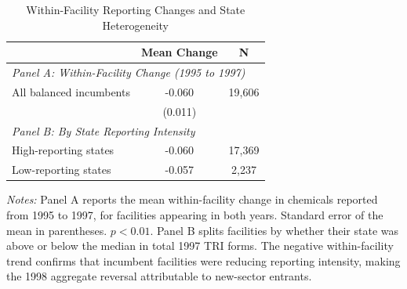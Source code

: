 \begin{table}[H]
\centering
\caption{Within-Facility Reporting Changes and State Heterogeneity}
\label{tab:robust}
\begin{threeparttable}
\begin{tabular}{lcc}
\toprule
 & Mean Change & N \\
\midrule
\multicolumn{3}{l}{\textit{Panel A: Within-Facility Change (1995 to 1997)}} \\
All balanced incumbents & -0.060\sym{***} & 19,606 \\
 & (0.011) & \\
\midrule
\multicolumn{3}{l}{\textit{Panel B: By State Reporting Intensity}} \\
High-reporting states & -0.060 & 17,369 \\
Low-reporting states & -0.057 & 2,237 \\
\bottomrule
\end{tabular}
\begin{tablenotes}[flushleft]
\small
\item \textit{Notes:} Panel A reports the mean within-facility change in chemicals reported from 1995 to 1997, for facilities appearing in both years. Standard error of the mean in parentheses. \sym{***} $p<0.01$. Panel B splits facilities by whether their state was above or below the median in total 1997 TRI forms. The negative within-facility trend confirms that incumbent facilities were reducing reporting intensity, making the 1998 aggregate reversal attributable to new-sector entrants.
\end{tablenotes}
\end{threeparttable}
\end{table}
